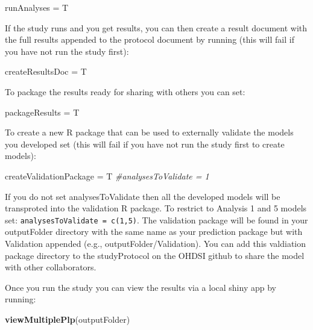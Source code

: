 \documentclass[]{article}
\newenvironment{Shaded}{\begin{snugshade}}{\end{snugshade}}
\newcommand{\KeywordTok}[1]{\textcolor[rgb]{0.13,0.29,0.53}{\textbf{#1}}}
\newcommand{\StringTok}[1]{\textcolor[rgb]{0.31,0.60,0.02}{#1}}
\newcommand{\CommentTok}[1]{\textcolor[rgb]{0.56,0.35,0.01}{\textit{#1}}}
\newcommand{\NormalTok}[1]{#1}
\begin{document}
\begin{Shaded}
\begin{Highlighting}[]
\NormalTok{    runAnalyses =}\StringTok{ }\NormalTok{T}
\end{Highlighting}
\end{Shaded}

If the study runs and you get results, you can then create a result
document with the full results appended to the protocol document by
running (this will fail if you have not run the study first):

\begin{Shaded}
\begin{Highlighting}[]
\NormalTok{    createResultsDoc =}\StringTok{ }\NormalTok{T}
\end{Highlighting}
\end{Shaded}

To package the results ready for sharing with others you can set:

\begin{Shaded}
\begin{Highlighting}[]
\NormalTok{    packageResults =}\StringTok{ }\NormalTok{T}
\end{Highlighting}
\end{Shaded}

To create a new R package that can be used to externally validate the
models you developed set (this will fail if you have not run the study
first to create models):

\begin{Shaded}
\begin{Highlighting}[]
\NormalTok{    createValidationPackage =}\StringTok{ }\NormalTok{T  }
    \CommentTok{#analysesToValidate = 1}
\end{Highlighting}
\end{Shaded}

If you do not set analysesToValidate then all the developed models will
be transproted into the validation R package. To restrict to Analysis 1
and 5 models set: \texttt{analysesToValidate\ =\ c(1,5)}. The validation
package will be found in your outputFolder directory with the same name
as your prediction package but with Validation appended (e.g.,
outputFolder/Validation). You can add this valdiation package directory
to the studyProtocol on the OHDSI github to share the model with other
collaborators.

Once you run the study you can view the results via a local shiny app by
running:

\begin{Shaded}
\begin{Highlighting}[]
    \KeywordTok{viewMultiplePlp}\NormalTok{(outputFolder) }
\end{Highlighting}
\end{Shaded}
\end{document}
